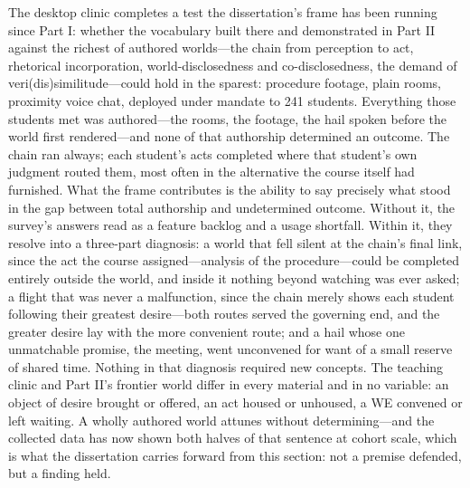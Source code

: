 
The desktop clinic completes a test the dissertation's frame has been
running since Part I: whether the vocabulary built there and
demonstrated in Part II against the richest of authored worlds---the chain from
perception to act, rhetorical incorporation, world-disclosedness and
co-disclosedness, the demand of veri(dis)similitude---could hold in
the sparest: procedure footage, plain rooms, proximity voice chat, deployed
under mandate to 241 students. Everything those
students met was authored---the rooms, the footage, the hail spoken
before the world first rendered---and none of that authorship
determined an outcome. The chain ran always; each student's acts
completed where that student's own judgment routed them, most often in
the alternative the course itself had furnished. What the frame
contributes is the ability to say precisely what stood in the gap
between total authorship and undetermined outcome. Without it, the
survey's answers read as a feature backlog and a usage shortfall.
Within it, they resolve into a three-part diagnosis: a world that fell
silent at the chain's final link, since the act the course
assigned---analysis of the procedure---could be completed entirely
outside the world, and inside it nothing beyond watching was ever
asked; a flight that was never a malfunction, since the chain merely
shows each student following their greatest desire---both routes
served the governing end, and the greater desire lay with the more
convenient route; and a hail whose one unmatchable promise, the
meeting, went unconvened for want of a small reserve of shared time. Nothing in that diagnosis required
new concepts. The teaching clinic and Part II's frontier world differ
in every material and in no variable: an object of desire brought or
offered, an act housed or unhoused, a WE convened or left waiting. A
wholly authored world attunes without determining---and the collected
data has now shown both halves of that sentence at cohort scale, which
is what the dissertation carries forward from this section: not a
premise defended, but a finding held.

